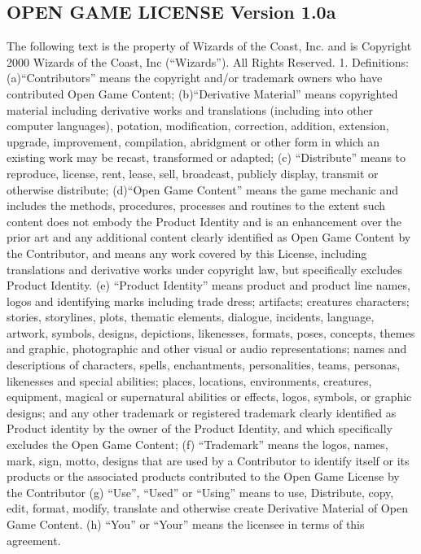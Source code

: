 \begin{multicols}{2}
\section{OPEN GAME LICENSE Version 1.0a}
The following text is the property of Wizards of the Coast, Inc. and is Copyright 2000 Wizards of the Coast, Inc (“Wizards”). All Rights Reserved.
1. Definitions: (a)“Contributors” means the copyright and/or trademark owners who have contributed Open Game Content; (b)“Derivative Material” means copyrighted material including derivative works and translations (including into other computer languages), potation, modification, correction, addition, extension, upgrade, improvement, compilation, abridgment or other form in which an existing work may be recast, transformed or adapted; (c) “Distribute” means to reproduce, license, rent, lease, sell, broadcast, publicly display, transmit or otherwise distribute; (d)“Open Game Content” means the game mechanic and includes the methods, procedures, processes and routines to the extent such content does not embody the Product Identity and is an enhancement over the prior art and any additional content clearly identified as Open Game Content by the Contributor, and means any work covered by this License, including translations and derivative works under copyright law, but specifically excludes Product Identity. (e) “Product Identity” means product and product line names, logos and identifying marks including trade dress; artifacts; creatures characters; stories, storylines, plots, thematic elements, dialogue, incidents, language, artwork, symbols, designs, depictions, likenesses, formats, poses, concepts, themes and graphic, photographic and other visual or audio representations; names and descriptions of characters, spells, enchantments, personalities, teams, personas, likenesses and special abilities; places, locations, environments, creatures, equipment, magical or supernatural abilities or effects, logos, symbols, or graphic designs; and any other trademark or registered trademark clearly identified as Product identity by the owner of the Product Identity, and which specifically excludes the Open Game Content; (f) “Trademark” means the logos, names, mark, sign, motto, designs that are used by a Contributor to identify itself or its products or the associated products contributed to the Open Game License by the Contributor (g) “Use”, “Used” or “Using” means to use, Distribute, copy, edit, format, modify, translate and otherwise create Derivative Material of Open Game Content. (h) “You” or “Your” means the licensee in terms of this agreement.

\end{multicols}
